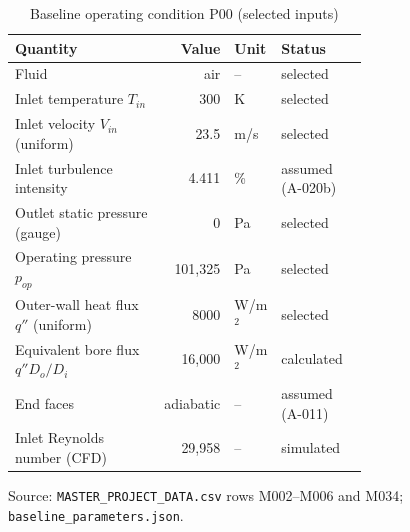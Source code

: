\begin{table}[htbp]
\centering
\small
\caption{Baseline operating condition P00 (selected inputs)}
\label{tab:operating}
\begin{tabular}{>{\raggedright\arraybackslash}p{0.45\linewidth}rl>{\raggedright\arraybackslash}p{0.25\linewidth}}
\toprule
Quantity & Value & Unit & Status \\
\midrule
Fluid & air & -- & selected \\
Inlet temperature $T_{in}$ & 300 & K & selected \\
Inlet velocity $V_{in}$ (uniform) & 23.5 & m/s & selected \\
Inlet turbulence intensity & 4.411 & \% & assumed (A-020b) \\
Outlet static pressure (gauge) & 0 & Pa & selected \\
Operating pressure $p_{op}$ & 101,325 & Pa & selected \\
Outer-wall heat flux $q''$ (uniform) & 8000 & W/m$^2$ & selected \\
Equivalent bore flux $q''D_o/D_i$ & 16,000 & W/m$^2$ & calculated \\
End faces & adiabatic & -- & assumed (A-011) \\
Inlet Reynolds number (CFD) & 29,958 & -- & simulated \\
\bottomrule
\end{tabular}
\par\smallskip\parbox{\linewidth}{\footnotesize\raggedright Source: \texttt{MASTER\_PROJECT\_DATA.csv} rows M002--M006 and M034; \texttt{baseline\_parameters.json}.}
\end{table}
